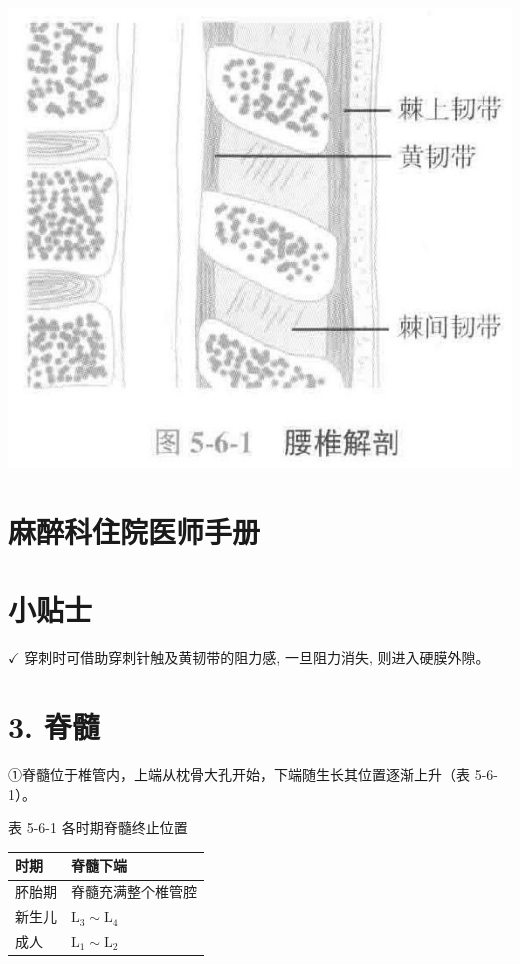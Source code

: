 \documentclass[10pt]{article}
\begin{document}
\begin{center}
\includegraphics[max width=\textwidth]{2024_07_05_645bb794a4d4f32ee0c8g-307}
\end{center}

\section*{麻醉科住院医师手册}
\section*{小贴士}
$\checkmark$ 穿刺时可借助穿刺针触及黄韧带的阻力感, 一旦阻力消失, 则进入硬膜外隙。

\section*{3. 脊髓}
①脊髓位于椎管内，上端从枕骨大孔开始，下端随生长其位置逐渐上升（表 5-6-1）。

表 5-6-1 各时期脊髓终止位置

\begin{center}
\begin{tabular}{ll}
\hline
时期 & 脊髓下端 \\
\hline
肧胎期 & 脊髓充满整个椎管腔 \\
新生儿 & $\mathrm{L}_{3} \sim \mathrm{L}_{4}$ \\
成人 & $\mathrm{L}_{1} \sim \mathrm{L}_{2}$ \\
\hline
\end{tabular}
\end{center}
\end{document}
